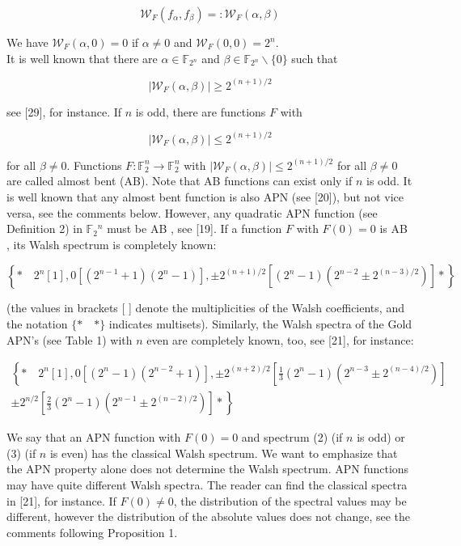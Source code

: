 \documentclass[10pt]{article}
\begin{document}
$$
\mathcal{W}_{F}\left(f_{\alpha}, f_{\beta}\right)=: \mathcal{W}_{F}(\alpha, \beta)
$$

We have $\mathcal{W}_{F}(\alpha, 0)=0$ if $\alpha \neq 0$ and $\mathcal{W}_{F}(0,0)=2^{n}$.\\
It is well known that there are $\alpha \in \mathbb{F}_{2^{n}}$ and $\beta \in \mathbb{F}_{2^{n}} \backslash\{0\}$ such that

$$
\left|\mathcal{W}_{F}(\alpha, \beta)\right| \geq 2^{(n+1) / 2}
$$

see [29], for instance. If $n$ is odd, there are functions $F$ with

$$
\left|\mathcal{W}_{F}(\alpha, \beta)\right| \leq 2^{(n+1) / 2}
$$

for all $\beta \neq 0$. Functions $F: \mathbb{F}_{2}^{n} \rightarrow \mathbb{F}_{2}^{n}$ with $\left|\mathcal{W}_{F}(\alpha, \beta)\right| \leq 2^{(n+1) / 2}$ for all $\beta \neq 0$ are called almost bent (AB). Note that AB functions can exist only if $n$ is odd. It is well known that any almost bent function is also APN (see [20]), but not vice versa, see the comments below. However, any quadratic APN function (see Definition 2) in $\mathbb{F}_{2}{ }^{n}$ must be AB , see [19]. If a function $F$ with $F(0)=0$ is AB , its Walsh spectrum is completely known:


\begin{equation*}
\left\{* \quad 2^{n}[1], 0\left[\left(2^{n-1}+1\right)\left(2^{n}-1\right)\right], \pm 2^{(n+1) / 2}\left[\left(2^{n}-1\right)\left(2^{n-2} \pm 2^{(n-3) / 2}\right)\right] *\right\} \tag{2}
\end{equation*}


(the values in brackets [ ] denote the multiplicities of the Walsh coefficients, and the notation $\{* \quad *\}$ indicates multisets). Similarly, the Walsh spectra of the Gold APN's (see Table 1) with $n$ even are completely known, too, see [21], for instance:


\begin{gather*}
\left\{* \quad 2^{n}[1], 0\left[\left(2^{n}-1\right)\left(2^{n-2}+1\right)\right], \pm 2^{(n+2) / 2}\left[\frac{1}{3}\left(2^{n}-1\right)\left(2^{n-3} \pm 2^{(n-4) / 2}\right)\right]\right.  \tag{3}\\
\left. \pm 2^{n / 2}\left[\frac{2}{3}\left(2^{n}-1\right)\left(2^{n-1} \pm 2^{(n-2) / 2}\right)\right] *\right\}
\end{gather*}


We say that an APN function with $F(0)=0$ and spectrum (2) (if $n$ is odd) or (3) (if $n$ is even) has the classical Walsh spectrum. We want to emphasize that the APN property alone does not determine the Walsh spectrum. APN functions may have quite different Walsh spectra. The reader can find the classical spectra in [21], for instance. If $F(0) \neq 0$, the distribution of the spectral values may be different, however the distribution of the absolute values does not change, see the comments following Proposition 1.
\end{document}
